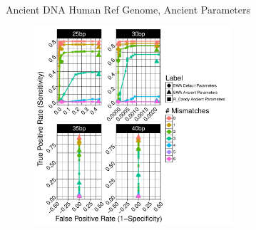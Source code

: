 \documentclass{beamer}
\begin{document}
\begin{frame}{\small{Ancient DNA Human Ref Genome, Ancient Parameters}}
	\begin{figure}[H]
		\centering
		\includegraphics[width=7.35cm]{pics/f_DS4_emp.pdf}
		
	\end{figure}

\end{frame}


\end{document}
